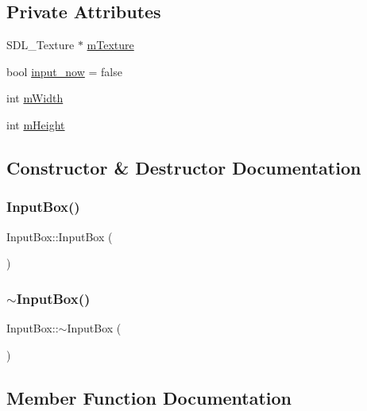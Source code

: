 \subsection*{Private Attributes}
\begin{DoxyCompactItemize}
\item 
S\+D\+L\+\_\+\+Texture $\ast$ \mbox{\hyperlink{class_input_box_a1a815a401dbec48509df67064c6285fa}{m\+Texture}}
\item 
bool \mbox{\hyperlink{class_input_box_a087fe852dbd3e02ad67b99eff151acc4}{input\+\_\+now}} = false
\item 
int \mbox{\hyperlink{class_input_box_a2f409469e712032ebafe5df6c6505ef6}{m\+Width}}
\item 
int \mbox{\hyperlink{class_input_box_a3d656bbf2eae8d5e640f3f09e4340eed}{m\+Height}}
\end{DoxyCompactItemize}


\subsection{Constructor \& Destructor Documentation}
\mbox{\label{class_input_box_a2cc665db8204ff3977b3601983dcad37}} 
\subsubsection{\texorpdfstring{Input\+Box()}{InputBox()}}
{\footnotesize\ttfamily Input\+Box\+::\+Input\+Box (\begin{DoxyParamCaption}{ }\end{DoxyParamCaption})}

\mbox{\label{class_input_box_abe56acf07570e1ff883705edf3223b5b}} 
\subsubsection{\texorpdfstring{$\sim$\+Input\+Box()}{~InputBox()}}
{\footnotesize\ttfamily Input\+Box\+::$\sim$\+Input\+Box (\begin{DoxyParamCaption}{ }\end{DoxyParamCaption})}



\subsection{Member Function Documentation}
\mbox{\label{class_input_box_aa5730c412bd2cb438d3920d457422899}} 
